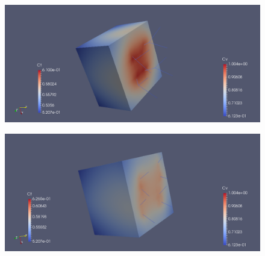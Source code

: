 \documentclass[10pt]{article} %
\begin{document}
	\begin{figure}[h]
		\centering
		\includegraphics[width=0.9\linewidth]{ct2}
		\label{fig:ct2}
	\end{figure}
	
	\begin{figure}[h]
		\centering
		\includegraphics[width=0.9\linewidth]{ct3}
		\label{fig:ct3}
	\end{figure}
	
\end{document}
